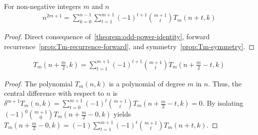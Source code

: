 \begin{proposition}
    \label{prop:odd-power-decomposition-forward-shifted}
    For non-negative integers $m$ and $n$
    \begin{align*}
        n^{2m+1} = \sum_{k=0}^{n-1} \sum_{t=1}^{m+1} (-1)^{t+1} \binom{m+1}{t} T_{m} (n+t, k)
    \end{align*}
    \begin{proof}
        Direct consequence of~\eqref{theorem:odd-power-identity},
        forward recurrence~\eqref{prop:Tm-recurrence-forward}, and symmetry~\eqref{prop:Tm-symmetry}.
    \end{proof}
\end{proposition}

\begin{proposition}
    \label{prop:Tm-recurrence-central}
    \begin{align*}
        T_{m} \left(n + \frac{m}{2}, k \right)
        = \sum_{t=1}^{m+1} (-1)^{t+1} \binom{m+1}{t} T_{m} \left( n+\frac{m}{2}-t, k \right)
    \end{align*}
    \begin{proof}
        The polynomial $T_{m} (n,k)$ is a polynomial of degree $m$ in $n$.
        Thus, the central difference with respect to $n$ is
        $\delta^{m+1} T_{m} (n, k) = \sum_{t=0}^{m+1} (-1)^{t} \binom{m+1}{t} T_{m} \left(n+\frac{m}{2} - t, k\right) = 0$.
        By isolating $(-1)^{0} \binom{m+1}{0} T_{m} \left(n+\frac{m}{2}-0, k\right)$ yields
        $T_{m} \left(n+\frac{m}{2}-0, k\right) = (-1) \sum_{t=1}^{m+1} (-1)^{t} \binom{m+1}{t} T_{m} (n+t, k)$.
    \end{proof}
\end{proposition}


